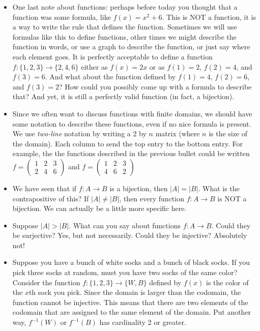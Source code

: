\documentclass[12pt]{article}
\theoremstyle{plain}
\theoremstyle{definition}
\theoremstyle{remark}
\def\inv{^{-1}}
\begin{document}
\begin{itemize}

  \item One last note about functions: perhaps before today you thought that a function was some formula, like $f(x) = x^2 + 6$.  This is NOT a function, it is a way to write the rule that defines the function.  Sometimes we will use formulas like this to define functions, other times we might describe the function in words, or use a graph to describe the function, or just say where each element goes.  It is perfectly acceptable to define a function $f:\{1,2,3\} \to \{2, 4, 6\}$ either as $f(x) = 2x$ or as $f(1) = 2$, $f(2) = 4$, and $f(3) = 6$.  And what about the function defined by $f(1) = 4$, $f(2) = 6$, and $f(3) = 2$?  How could you possibly come up with a formula to describe that?  And yet, it is still a perfectly valid function (in fact, a bijection).

  \item Since we often want to discuss functions with finite domains, we should have some notation to describe these functions, even if no nice formula is present.  We use \emph{two-line} notation by writing a 2 by $n$ matrix (where $n$ is the size of the domain).  Each column to send the top entry to the bottom entry.  For example, the the functions described in the previous bullet could be written $f = \begin{pmatrix}1 & 2 & 3 \\ 2 & 4 & 6\end{pmatrix}$ and $f = \begin{pmatrix}1 & 2 & 3 \\ 4 & 6 & 2\end{pmatrix}$

\item We have seen that if $f:A \to B$ is a bijection, then $|A| = |B|$.  What is the contrapositive of this?  If $|A| \ne |B|$, then every function $f:A \to B$ is NOT a bijection.  We can actually be a little more specific here.

\item Suppose $|A| > |B|$.  What can you say about functions $f: A \to B$.  Could they be surjective?  Yes, but not necessarily.  Could they be injective?  Absolutely not!

\item Suppose you have a bunch of white socks and a bunch of black socks.  If you pick three socks at random, must you have two socks of the same color?  Consider the function $f:\{1,2,3\} \to \{W, B\}$ defined by $f(x)$ is the color of the $x$th sock you pick.  Since the domain is larger than the codomain, the function cannot be injective.  This means that there are two elements of the codomain that are assigned to the same element of the domain.  Put another way, $f\inv(W)$ or $f\inv(B)$ has cardinality 2 or greater.
\end{itemize}
\end{document}
